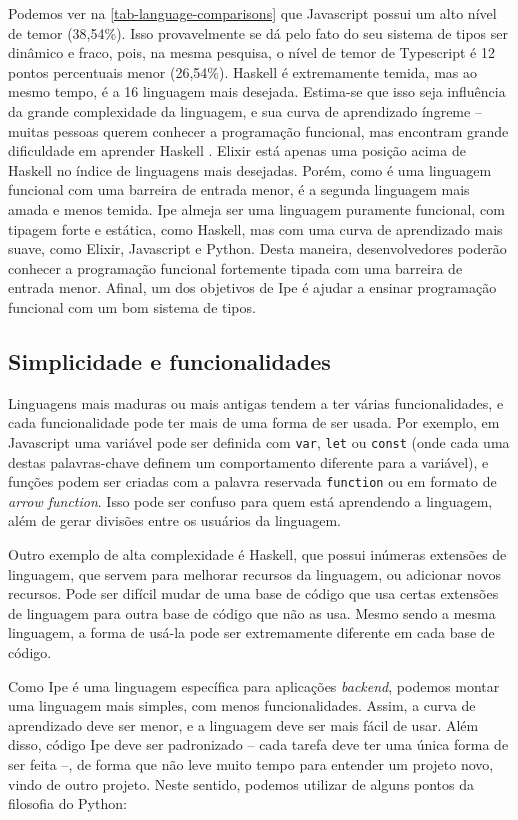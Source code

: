 Podemos ver na \autoref{tab-language-comparisons} que Javascript possui um alto nível de temor (38,54\%). Isso
provavelmente se dá pelo fato do seu sistema de tipos ser dinâmico e fraco, pois,
na mesma pesquisa, o nível de temor de Typescript é 12 pontos percentuais menor
(26,54\%). Haskell é extremamente temida, mas ao mesmo tempo, é a 16\textordfeminine{}
linguagem mais desejada. Estima-se que isso seja influência da grande complexidade da
linguagem, e sua curva de aprendizado íngreme -- muitas pessoas querem conhecer
a programação funcional, mas encontram grande dificuldade em aprender Haskell \cite{haskellintroduction}.
Elixir está apenas uma posição acima de Haskell no índice de linguagens mais
desejadas. Porém, como é uma linguagem funcional com uma barreira de entrada menor,
é a segunda linguagem mais amada e menos temida. Ipe almeja ser uma linguagem
puramente funcional, com tipagem forte e estática, como Haskell, mas com uma
curva de aprendizado mais suave, como Elixir, Javascript e Python. Desta maneira,
desenvolvedores poderão conhecer a programação funcional fortemente tipada com
uma barreira de entrada menor. Afinal, um dos objetivos de Ipe é ajudar a
ensinar programação funcional com um bom sistema de tipos.


\subsection{Simplicidade e funcionalidades}

Linguagens mais maduras ou mais antigas tendem a ter várias funcionalidades, e
cada funcionalidade pode ter mais de uma forma de ser usada. Por exemplo, em
Javascript uma variável pode ser definida com \texttt{var}, \texttt{let} ou
\texttt{const} (onde cada uma destas palavras-chave definem um comportamento diferente para a variável),
e funções podem ser criadas com a palavra reservada \texttt{function} ou em formato de \textit{arrow function}.
Isso pode ser confuso para quem está aprendendo a linguagem, além de gerar divisões entre os usuários
da linguagem.

Outro exemplo de alta complexidade é Haskell, que possui inúmeras extensões de
linguagem, que servem para melhorar recursos da linguagem, ou adicionar novos
recursos. Pode ser difícil mudar de uma base de código que usa certas extensões
de linguagem para outra base de código que não as usa. Mesmo sendo a mesma linguagem,
a forma de usá-la pode ser extremamente diferente em cada base de código.

Como Ipe é uma linguagem específica para aplicações \textit{backend}, podemos
montar uma linguagem mais simples, com menos funcionalidades. Assim, a curva de
aprendizado deve ser menor, e a linguagem deve ser mais fácil de usar. Além disso,
código Ipe deve ser padronizado -- cada tarefa deve ter uma única forma de ser feita --,
de forma que não leve muito tempo para entender um projeto novo, vindo de outro projeto.
Neste sentido, podemos utilizar de alguns pontos da filosofia do Python:

